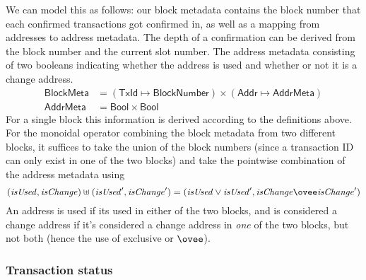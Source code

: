 \documentclass{article}
\theoremstyle{definition}{
  \newtheorem{lemma}{Lemma}[section] %
  \newtheorem{definition}[lemma]{Definition}
}
\theoremstyle{theorem}{
  \newtheorem{invariant}[lemma]{Invariant}
  \newtheorem{proofobligation}[lemma]{Proof Obligation}
}
\numberwithin{equation}{lemma}
\begin{document}
We can model this as follows: our block metadata contains the block number that
each confirmed transactions got confirmed in, as well as a mapping from
addresses to address metadata. The depth of a confirmation can be derived from
the block number and the current slot number. The address metadata consisting
of two booleans indicating whether the address is used and whether or not it is
a change address.
%
\begin{align*}
\mathsf{BlockMeta} & = (\mathsf{TxId} \mapsto \mathsf{BlockNumber})
                \times (\mathsf{Addr} \mapsto \mathsf{AddrMeta}) \\
\mathsf{AddrMeta} & = \mathsf{Bool} \times \mathsf{Bool}
\end{align*}
%
For a single block this information is derived according to the definitions
above. For the monoidal operator combining the block metadata from two different
blocks, it suffices to take the union of the block numbers (since a transaction
ID can only exist in one of the two blocks) and take the pointwise combination
of the address metadata using
%
\begin{equation*}
  (\mathit{isUsed}, \mathit{isChange}) \uplus (\mathit{isUsed}', \mathit{isChange}')
= (\mathit{isUsed} \vee \mathit{isUsed}', \mathit{isChange} \ovee \mathit{isChange}')
\end{equation*}
%
An address is used if its used in either of the two blocks, and is considered
a change address if it's considered a change address in \emph{one} of the
two blocks, but not both (hence the use of exclusive or $\ovee$).

\subsubsection{Transaction status}
\label{sec:transaction_status}
\end{document}
